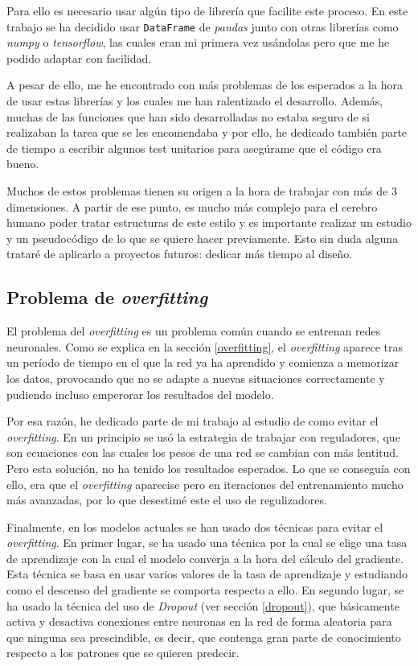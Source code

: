 Para ello es necesario usar algún tipo de librería que facilite este proceso. En este trabajo se ha decidido usar \verb|DataFrame| de \textit{pandas} junto con otras librerías como \textit{numpy} o \textit{tensorflow}, las cuales eran mi primera vez usándolas pero que me he podido adaptar con facilidad.
\newline

A pesar de ello, me he encontrado con más problemas de los esperados a la hora de usar estas librerías y los cuales me han ralentizado el desarrollo. Además, muchas de las funciones que han sido desarrolladas no estaba seguro de si realizaban la tarea que se les encomendaba y por ello, he dedicado también parte de tiempo a escribir algunos test unitarios para asegúrame que el código era bueno.
\newline

Muchos de estos problemas tienen su origen a la hora de trabajar con más de 3 dimensiones. A partir de ese punto, es mucho más complejo para el cerebro humano poder tratar estructuras de este estilo y es importante realizar un estudio y un pseudocódigo de lo que se quiere hacer previamente. Esto sin duda alguna trataré de aplicarlo a proyectos futuros: dedicar más tiempo al diseño.

\subsection{Problema de \textit{overfitting}}

El problema del \textit{overfitting} es un problema común cuando se entrenan redes neuronales. Como se explica en la sección \ref{overfitting}, el \textit{overfitting} aparece tras un período de tiempo en el que la red ya ha aprendido y comienza a memorizar los datos, provocando que no se adapte a nuevas situaciones correctamente y pudiendo incluso emperorar los resultados del modelo.
\newline

Por esa razón, he dedicado parte de mi trabajo al estudio de como evitar el \textit{overfitting}. En un principio se usó la estrategia de trabajar con reguladores, que son ecuaciones con las cuales los pesos de una red se cambian con más lentitud. Pero esta solución, no ha tenido los resultados esperados. Lo que se conseguía con ello, era que el \textit{overfitting} aparecise pero en iteraciones del entrenamiento mucho más avanzadas, por lo que desestimé este el uso de regulizadores.
\newline

Finalmente, en los modelos actuales se han usado dos técnicas para evitar el \textit{overfitting}. En primer lugar, se ha usado una técnica por la cual se elige una tasa de aprendizaje con la cual el modelo converja a la hora del cálculo del gradiente. Esta técnica se basa en usar varios valores de la tasa de aprendizaje y estudiando como el descenso del gradiente se comporta respecto a ello. En segundo lugar, se ha usado la técnica del uso de \textit{Dropout} (ver sección \ref{dropout}), que básicamente activa y desactiva conexiones entre neuronas en la red de forma aleatoria para que ninguna sea prescindible, es decir, que contenga gran parte de conocimiento respecto a los patrones que se quieren predecir.
